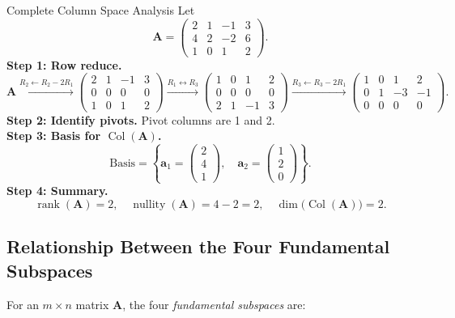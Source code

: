\documentclass[12pt,a4paper]{article}
\newcommand{\vv}[1]{\mathbf{#1}}
\newcommand{\rank}{\operatorname{rank}}
\newcommand{\nullity}{\operatorname{nullity}}
\newcommand{\Col}{\operatorname{Col}}
\newcommand{\mat}[1]{\mathbf{#1}}
\begin{document}
	\begin{exbox}{Complete Column Space Analysis}{}
		Let
		\[
		\mat{A} =
		\begin{pmatrix}
			2 & 1 & -1 & 3 \\
			4 & 2 & -2 & 6 \\
			1 & 0 &  1 & 2
		\end{pmatrix}.
		\]
		\textbf{Step 1: Row reduce.}
		\[
		\mat{A}
		\xrightarrow{R_2 \leftarrow R_2 - 2R_1}
		\begin{pmatrix}
			2 & 1 & -1 & 3 \\
			0 & 0 & 0 & 0 \\
			1 & 0 & 1 & 2
		\end{pmatrix}
		\xrightarrow{R_1 \leftrightarrow R_3}
		\begin{pmatrix}
			1 & 0 & 1 & 2 \\
			0 & 0 & 0 & 0 \\
			2 & 1 & -1 & 3
		\end{pmatrix}
		\xrightarrow{R_3 \leftarrow R_3 - 2R_1}
		\begin{pmatrix}
			1 & 0 & 1 & 2 \\
			0 & 1 & -3 & -1 \\
			0 & 0 & 0 & 0
		\end{pmatrix}.
		\]
		\textbf{Step 2: Identify pivots.}
		Pivot columns are 1 and 2.\\[4pt]
		\textbf{Step 3: Basis for \(\Col(\mat{A})\).}
		\[
		\text{Basis} = \left\{
		\vv{a}_1 = \begin{pmatrix}2\\4\\1\end{pmatrix},\quad
		\vv{a}_2 = \begin{pmatrix}1\\2\\0\end{pmatrix}
		\right\}.
		\]
		\textbf{Step 4: Summary.}
		\[
		\rank(\mat{A}) = 2, \quad
		\nullity(\mat{A}) = 4 - 2 = 2, \quad
		\dim\bigl(\Col(\mat{A})\bigr) = 2.
		\]
	\end{exbox}
	
	\subsection{Relationship Between the Four Fundamental Subspaces}
	
	For an \(m \times n\) matrix \(\mat{A}\), the four \emph{fundamental subspaces} are:
	
\end{document}
